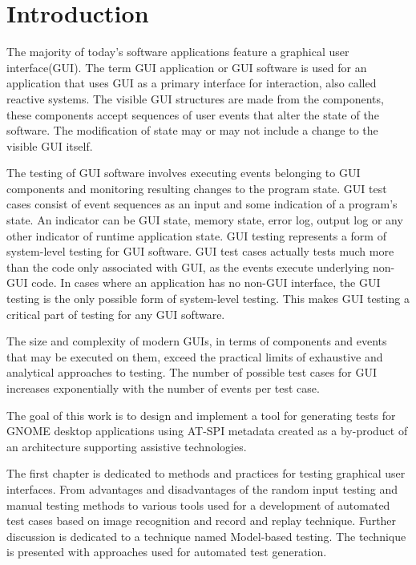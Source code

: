 
\chapter{Introduction}
The majority of today's software applications feature a graphical user interface(GUI). The term GUI application or GUI software is used for an application that uses GUI as a primary interface for interaction, also called reactive systems. The visible GUI structures are made from the components, these components accept sequences of user events that alter the state of the software. The modification of state may or may not include a change to the visible GUI itself. 

The testing of GUI software involves executing events belonging to GUI components and monitoring resulting changes to the program state. GUI test cases consist of event sequences as an input and some indication of a program's state. An indicator can be GUI state, memory state, error log, output log or any other indicator of runtime application state. GUI testing represents a form of system-level testing for GUI software. GUI test cases actually tests much more than the code only associated with GUI, as the events execute underlying non-GUI code. In cases where an application has no non-GUI interface, the GUI testing is the only possible form of system-level testing. This makes GUI testing a critical part of testing for any GUI software.

The size and complexity of modern GUIs, in terms of components and events that may be executed on them, exceed the practical limits of exhaustive and analytical approaches to testing. The number of possible test cases for GUI increases exponentially with the number of events per test case.\cite{NguyenBao2014Gait}

The goal of this work is to design and implement a tool for generating tests for GNOME desktop applications using AT-SPI metadata created as a by-product of an architecture supporting assistive technologies.

The first chapter is dedicated to methods and practices for testing graphical user interfaces. From advantages and disadvantages of the random input testing and manual testing methods to various tools used for a development of automated test cases based on image recognition and record and replay technique. Further discussion is dedicated to a technique named Model-based testing. The technique is presented with approaches used for automated test generation. 

